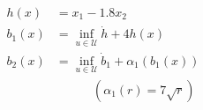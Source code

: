 \documentclass[preview]{standalone}
\begin{document}
\begin{align*}
h(x) &= x_1 - 1.8 x_2\\ b_1(x) &= \inf_{u \in \mathcal{U}} \dot h +  4h(x)\\ b_2(x) &= \inf_{u \in \mathcal{U}} \dot b_1 +  \alpha_1(b_1(x))\\ &{}\quad\quad \quad (\alpha_1(r) = 7 \sqrt{r})
\end{align*}
\end{document}
